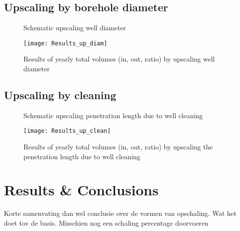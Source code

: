 \subsection{Upscaling by borehole diameter}

\begin{figure}[h]
\centering
{}
\captionsetup{justification=centering}
\caption{Schematic upscaling well diameter}
\label{fig:Schematic_up_diam}
\end{figure}

\begin{figure}[h!]
 \centering
 \texttt{[image: Results\_up\_diam]}
 \captionsetup{justification=centering} 
 \caption{Results of yearly total volumes (in, out, ratio) by upscaling well diameter}
 \label{fig:Results_up_diam}
\end{figure}


\subsection{Upscaling by cleaning}

\begin{figure}[h]
\centering
{}
\captionsetup{justification=centering}
\caption{Schematic upscaling penetration length due to well cleaning}
\label{fig:Schematic_up_clean}
\end{figure}


\begin{figure}[h!]
 \centering
 \texttt{[image: Results\_up\_clean]}
 \captionsetup{justification=centering} 
 \caption{Results of yearly total volumes (in, out, ratio) by upscaling the penetration length due to well cleaning}
 \label{fig:Results_up_clean}
\end{figure}


\section{Results \& Conclusions}
Korte samenvating dan wel conclusie over de vormen van opschaling. Wat het doet tov de basis. Misschien nog een schaling percentage doorvoeren 